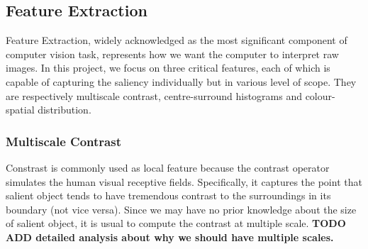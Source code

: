 \documentclass[10pt,twocolumn,letterpaper]{article}
\newcommand{\BOLD}{\textbf}
\begin{document}
\subsection{Feature Extraction}
Feature Extraction, widely acknowledged as the most significant component of computer vision task, represents how we want the computer to interpret raw images. In this project, we focus on three critical features, each of which is capable of capturing the saliency individually but in various level of scope. They are respectively multiscale contrast, centre-surround histograms  and colour-spatial distribution. 
\subsubsection{Multiscale Contrast}

Constrast is commonly used as local feature because the contrast operator simulates the human visual receptive fields. Specifically, it captures the point that salient object tends to have tremendous contrast to the surroundings in its boundary (not vice versa). Since we may have no prior knowledge about the size of salient object, it is usual to compute the contrast at multiple scale. 
\BOLD{TODO ADD detailed analysis about why we should have multiple scales.}
\end{document}
